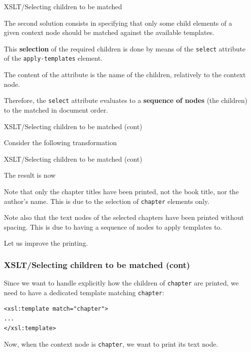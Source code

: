 %
\begin{frame}{XSLT/Selecting children to be matched}

The second solution consists in specifying that only some child
elements of a given context node should be matched against the
available templates.

\bigskip

This \textbf{selection} of the required children is done by means of
the \texttt{select} attribute of the \texttt{apply-templates}
element.

\bigskip

The content of the attribute is the name of the children,
relatively to the context node.

\bigskip

Therefore, the \texttt{select} attribute evaluates to a
\textbf{sequence of nodes} (the children) to the matched in document
order.

\end{frame}

%
\begin{frame}{XSLT/Selecting children to be matched (cont)}

Consider the following \XSLT transformation

\end{frame}

%
\begin{frame}{XSLT/Selecting children to be matched (cont)}

The result is now

\bigskip

Note that only the chapter titles have been printed, not the book
title, nor the author's name. This is due to the selection of
\texttt{chapter} elements only.

\bigskip

Note also that the text nodes of the selected chapters have been
printed without spacing. This is due to having a sequence of nodes to
apply templates to.

\bigskip

Let us improve the printing.

\end{frame}

%
\begin{frame}[containsverbatim]
\frametitle{XSLT/Selecting children to be matched (cont)}

Since we want to handle explicitly how the children of
\texttt{chapter} are printed, we need to have a dedicated template
matching \texttt{chapter}:
{\small
\begin{verbatim}
<xsl:template match="chapter">
...
</xsl:template>
\end{verbatim}
}
Now, when the context node is \texttt{chapter}, we want to print its
text node.

\end{frame}

